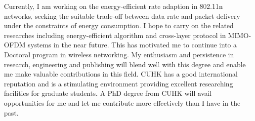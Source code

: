 \documentclass[conference,onecolumn]{IEEEtran}
\begin{document}
Currently, I am working on the energy-efficient rate adaption in 802.11n networks, seeking the suitable trade-off between data rate and packet delivery under the constraints of energy consumption. I hope to carry on the related researches including energy-efficient algorithm and cross-layer protocol in MIMO-OFDM systems in the near future. This has motivated me to continue into a Doctoral program in wireless networking. My enthusiasm and persistence in research, engineering and publishing will blend well with this degree and enable me make valuable contributions in this field. CUHK has a good international reputation and is a stimulating environment providing excellent researching facilities for graduate students. A PhD degree from CUHK will avail opportunities for me and let me contribute more effectively than I have in the past.
\end{document}
